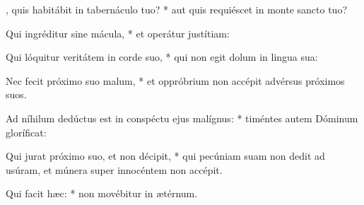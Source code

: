 \begin{psalmus}

    , quis habitábit in tabernáculo tuo? * aut quis requiéscet in monte sancto tuo?

    Qui ingréditur sine mácula, * et operátur justítiam:

    Qui lóquitur veritátem in corde suo, * qui non egit dolum in lingua sua:

    Nec fecit próximo suo malum, * et oppróbrium non accépit advérsus próximos suos.

    Ad níhilum dedúctus est in conspéctu ejus malígnus: * timéntes autem Dóminum gloríficat:

    Qui jurat próximo suo, et non décipit, * qui pecúniam suam non dedit ad usúram, et múnera super innocéntem non accépit.

    Qui facit hæc: * non movébitur in ætérnum.

\end{psalmus}
